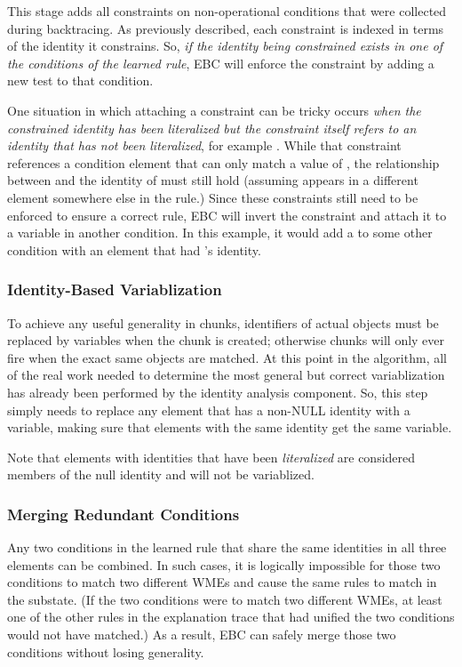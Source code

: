 This stage adds all constraints on non-operational conditions that were collected during backtracing.  As previously described, each constraint is indexed in terms of the identity it constrains.  So, \textit{if the identity being constrained exists in one of the conditions of the learned rule}, EBC will enforce the constraint by adding a new test to that condition.

One situation in which attaching a constraint can be tricky occurs \textit{when the constrained identity has been literalized but the constraint itself refers to an identity that has not been literalized}, for example .  While that constraint references a condition element that can only match a value of , the relationship between  and the identity of  must still hold (assuming  appears in a different element somewhere else in the rule.)  Since these constraints still need to be enforced to ensure a correct rule, EBC will invert the constraint and attach it to a variable in another condition.  In this example, it would add a  to some other condition with an element that had 's identity.

\subsubsection{Identity-Based Variablization}

To achieve any useful generality in chunks, identifiers of actual objects must be replaced by variables when the chunk is created; otherwise chunks will only ever fire when the exact same objects are matched.  At this point in the algorithm, all of the real work needed to determine the most general but correct variablization has already been performed by the identity analysis component.  So, this step simply needs to replace any element that has a non-NULL identity with a variable, making sure that elements with the same identity get the same variable.

Note that elements with identities that have been \textit{literalized} are considered members of the null identity and will not be variablized.

\subsubsection{Merging Redundant Conditions}

Any two conditions in the learned rule that share the same identities in all three elements can be combined.  In such cases, it is logically impossible for those two conditions to match two different WMEs and cause the same rules to match in the substate.  (If the two conditions were to match two different WMEs, at least one of the other rules in the explanation trace that had unified the two conditions would not have matched.)  As a result, EBC can safely merge those two conditions without losing generality.  

